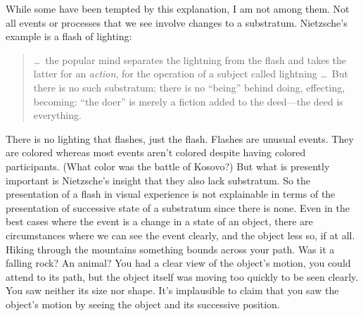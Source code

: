 \documentclass[12pt]{article}
\begin{document}
While some have been tempted by this explanation, I am not among them. Not all events or processes that we see involve changes to a substratum. Nietzsche's \citeyearpar[]{Nietzsche1887On-the-Genealog} example is a flash of lighting:
\begin{quote}
    \ldots\ the popular mind separates the lightning from the flash and takes the latter for an \emph{action}, for the operation of a subject called lightning \ldots\ But there is no such substratum; there is no ``being'' behind doing, effecting, becoming: ``the doer'' is merely a fiction added to the deed---the deed is everything. \citep[first essay, section 13]{Nietzsche1887On-the-Genealog}
\end{quote}
There is no lighting that flashes, just the flash. Flashes are unusual events. They are colored whereas most events aren't colored despite having colored participants. (What color was the battle of Kosovo?) But what is presently important is Nietzsche's insight that they also lack substratum. So the presentation of a flash in visual experience is not explainable in terms of the presentation of successive state of a substratum since there is none. Even in the best cases where the event is a change in a state of an object, there are circumstances where we can see the event clearly, and the object less so, if at all. Hiking through the mountains something bounds across your path. Was it a falling rock? An animal? You had a clear view of the object's motion, you could attend to its path, but the object itself was moving too quickly to be seen clearly. You saw neither its size nor shape. It's implausible to claim that you saw the object's motion by seeing the object and its successive position.
\end{document}
